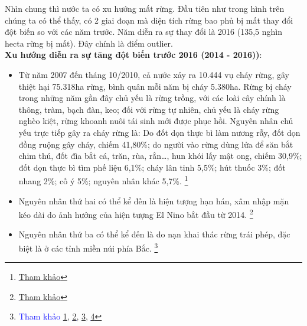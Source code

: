 \documentclass[a4paper,12pt]{report}
\begin{document}
\begin{flushleft}
	Nhìn chung thì nước ta có xu hướng mất rừng. Đầu tiên như trong hình trên chúng ta có thể thấy, có 2 giai đoạn mà diện tích rừng bao phủ bị mất thay đổi đột biến so với các năm trước. Năm diễn ra sự thay đổi là 2016 (135,5 nghìn hecta rừng bị mất). Đây chính là điểm outlier.
	\\[\baselineskip]

	\textbf{Xu hướng diễn ra sự tăng đột biến trước 2016 (2014 - 2016))}:
	\begin{itemize}
		\item Từ năm 2007 đến tháng 10/2010, cả nước xảy ra 10.444 vụ cháy rừng, gây thiệt hại 75.318ha rừng, bình quân mỗi năm bị cháy 5.380ha. Rừng bị cháy trong những năm gần đây chủ yếu là rừng trồng, với các loài cây chính là thông, tràm, bạch đàn, keo; đối với rừng tự nhiên, chủ yếu là cháy rừng nghèo kiệt, rừng khoanh nuôi tái sinh mới được phục hồi. Nguyên nhân chủ yếu trực tiếp gây ra cháy rừng là: Do đốt dọn thực bì làm nương rẫy, đốt dọn đồng ruộng gây cháy, chiếm 41,80\%; do người vào rừng dùng lửa để săn bắt chim thú, đốt đìa bắt cá, trăn, rùa, rắn…, hun khói lấy mật ong, chiếm 30,9\%; đốt dọn thực bì tìm phế liệu 6,1\%; cháy lân tinh 5,5\%; hút thuốc 3\%; đốt nhang 2\%; cố ý 5\%; nguyên nhân khác 5,7\%. \footnote{\textcolor{blue}{\underline{\href{http://www.kiemlam.org.vn/PortletBlank.aspx/89E2ECE261054E6DA2D06A694DE50016/View/So-12/TONG_QUAN_VE_BAO_VE_RUNG_VIET_NAM_VA_NHUNG_GIAI_PHAP_BAO_VE_RUNG/?print=904195979}{Tham khảo}}}}

		\item Nguyên nhân thứ hai có thể kể đến là hiện tượng hạn hán, xâm nhập mặn kéo dài do ảnh hưởng của hiện tượng El Nino bắt đầu từ 2014. \footnote{\textcolor{blue}{\underline{\href{https://nld.com.vn/thoi-su-quoc-te/el-nino-2014-manh-nhat-trong-nhieu-nam-20140505210910616.htm}{Tham khảo}}}}

		\item Nguyên nhân thứ ba có thể kể đến là do nạn khai thác rừng trái phép, đặc biệt là ở các tỉnh miền núi phía Bắc. \footnote{
			\textcolor{blue}{
			Tham khảo \underline{\href{https://dangcongsan.vn/phap-luat/nan-pha-rung-tang-dot-bien-o-dak-nong-313271.html}{1}}},
			\textcolor{blue}{\underline{\href{https://nhandan.vn/bao-dong-nan-pha-rung-o-bac-giang-post293931.html}{2}}},
			\textcolor{blue}{\underline{\href{https://baotintuc.vn/xa-hoi/bao-dong-do-nan-pha-rung-o-dien-bien-20150806175555226.htm}{3}}},
			\textcolor{blue}{\underline{\href{https://thanhnien.vn/pha-rung-tu-nhien-de-trong-cay-ngan-ngay-1851447176.htm}{4}}}
		}


\end{itemize}
\end{flushleft}
\end{document}
